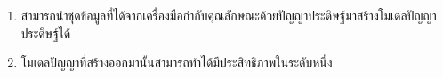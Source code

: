 \begin{enumerate}
	\item สามารถนำชุดข้อมูลที่ได้จากเครื่องมือกำกับคุณลักษณะด้วยปัญญาประดิษฐ์มาสร้างโมเดลปัญญาประดิษฐ์ได้
	\item โมเดลปัญญาที่สร้างออกมานั้นสามารถทำได้มีประสิทธิภาพในระดับหนึ่ง
\end{enumerate}